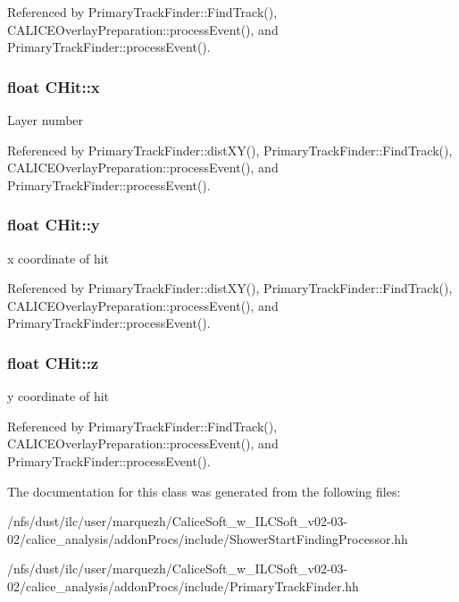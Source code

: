 Referenced by Primary\-Track\-Finder\-::\-Find\-Track(), C\-A\-L\-I\-C\-E\-Overlay\-Preparation\-::process\-Event(), and Primary\-Track\-Finder\-::process\-Event().

\subsubsection[{x}]{\setlength{\rightskip}{0pt plus 5cm}float C\-Hit\-::x}\label{classCALICE_1_1CHit_a2d75c2ec6af4d1974d54dc7c95bb3769}
Layer number 

Referenced by Primary\-Track\-Finder\-::dist\-X\-Y(), Primary\-Track\-Finder\-::\-Find\-Track(), C\-A\-L\-I\-C\-E\-Overlay\-Preparation\-::process\-Event(), and Primary\-Track\-Finder\-::process\-Event().

\subsubsection[{y}]{\setlength{\rightskip}{0pt plus 5cm}float C\-Hit\-::y}\label{classCALICE_1_1CHit_a9ae960cc5bb59e64f41814c05501067f}
x coordinate of hit 

Referenced by Primary\-Track\-Finder\-::dist\-X\-Y(), Primary\-Track\-Finder\-::\-Find\-Track(), C\-A\-L\-I\-C\-E\-Overlay\-Preparation\-::process\-Event(), and Primary\-Track\-Finder\-::process\-Event().

\subsubsection[{z}]{\setlength{\rightskip}{0pt plus 5cm}float C\-Hit\-::z}\label{classCALICE_1_1CHit_ab1d439b8468fc38824edd2242475458e}
y coordinate of hit 

Referenced by Primary\-Track\-Finder\-::\-Find\-Track(), C\-A\-L\-I\-C\-E\-Overlay\-Preparation\-::process\-Event(), and Primary\-Track\-Finder\-::process\-Event().



The documentation for this class was generated from the following files\-:\begin{DoxyCompactItemize}
\item 
/nfs/dust/ilc/user/marquezh/\-Calice\-Soft\-\_\-w\-\_\-\-I\-L\-C\-Soft\-\_\-v02-\/03-\/02/calice\-\_\-analysis/addon\-Procs/include/Shower\-Start\-Finding\-Processor.\-hh\item 
/nfs/dust/ilc/user/marquezh/\-Calice\-Soft\-\_\-w\-\_\-\-I\-L\-C\-Soft\-\_\-v02-\/03-\/02/calice\-\_\-analysis/addon\-Procs/include/Primary\-Track\-Finder.\-hh\end{DoxyCompactItemize}
